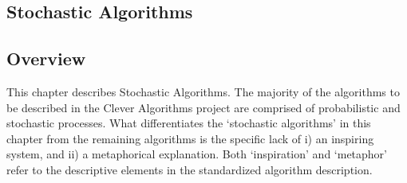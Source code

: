 

\renewcommand{\bibsection}{\subsection{\bibname}}
\begin{bibunit}

\chapter{Stochastic Algorithms}
\label{ch:stochastic}

% 
% 
\section{Overview}
This chapter describes Stochastic Algorithms.
The majority of the algorithms to be described in the Clever Algorithms project are comprised of probabilistic and stochastic processes. What differentiates the `stochastic algorithms' in this chapter from the remaining algorithms is the specific lack of i) an inspiring system, and ii) a metaphorical explanation. Both `inspiration' and `metaphor' refer to the descriptive elements in the standardized algorithm description.



\end{bibunit}
